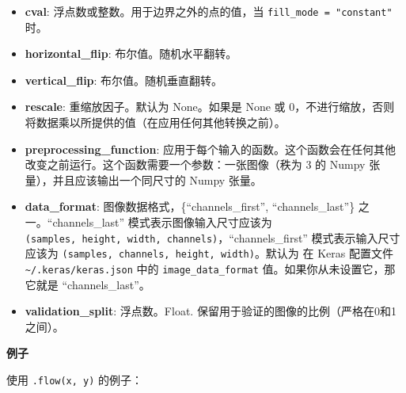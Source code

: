 \begin{itemize}
  \begin{itemize}
  \tightlist
  \item
    `constant': kkkkkkkk\textbar{}abcd\textbar{}kkkkkkkk (cval=k)
  \item
    `nearest': aaaaaaaa\textbar{}abcd\textbar{}dddddddd
  \item
    `reflect': abcddcba\textbar{}abcd\textbar{}dcbaabcd
  \item
    `wrap': abcdabcd\textbar{}abcd\textbar{}abcdabcd
  \end{itemize}
\item
  \textbf{cval}: 浮点数或整数。用于边界之外的点的值，当
  \texttt{fill\_mode\ =\ "constant"} 时。
\item
  \textbf{horizontal\_flip}: 布尔值。随机水平翻转。
\item
  \textbf{vertical\_flip}: 布尔值。随机垂直翻转。
\item
  \textbf{rescale}: 重缩放因子。默认为 None。如果是 None 或
  0，不进行缩放，否则将数据乘以所提供的值（在应用任何其他转换之前）。
\item
  \textbf{preprocessing\_function}:
  应用于每个输入的函数。这个函数会在任何其他改变之前运行。这个函数需要一个参数：一张图像（秩为
  3 的 Numpy 张量），并且应该输出一个同尺寸的 Numpy 张量。
\item
  \textbf{data\_format}: 图像数据格式，\{``channels\_first'',
  ``channels\_last''\} 之一。``channels\_last''
  模式表示图像输入尺寸应该为
  \texttt{(samples,\ height,\ width,\ channels)}，``channels\_first''
  模式表示输入尺寸应该为
  \texttt{(samples,\ channels,\ height,\ width)}。默认为 在 Keras
  配置文件 \texttt{\textasciitilde{}/.keras/keras.json} 中的
  \texttt{image\_data\_format} 值。如果你从未设置它，那它就是
  ``channels\_last''。
\item
  \textbf{validation\_split}: 浮点数。Float.
  保留用于验证的图像的比例（严格在0和1之间）。
\end{itemize}

\textbf{例子}

使用 \texttt{.flow(x,\ y)} 的例子：

